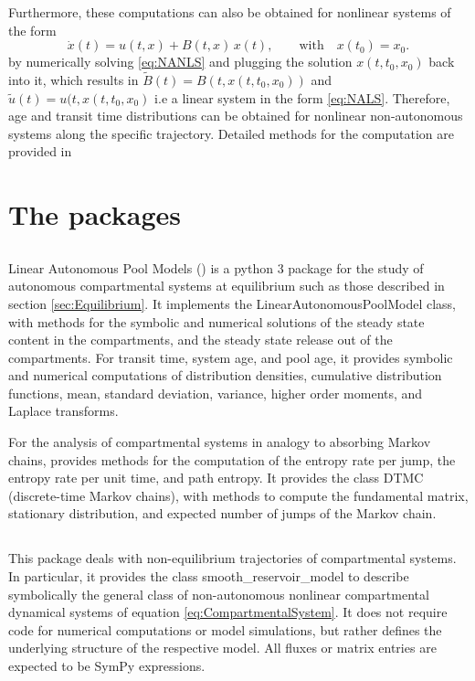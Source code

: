 Furthermore, these computations can also be obtained for nonlinear systems of the form
\begin{equation} \label{eq:NANLS}
\dot{x}(t) = u(t, x) + B(t, x) \, x(t), \qquad  \mathrm{with} \quad x(t_0) = x_0.
\end{equation}
by numerically solving \eqref{eq:NANLS} and plugging the solution $x(t, t_0,
x_0)$ back into it, which results in $\tilde{B}(t)=B(t,x(t, t_0,x_0))$ and
$\tilde{u}(t)=u(t,x(t, t_0,x_0)$  i.e a linear system in the form
\eqref{eq:NALS}. 
Therefore,  age and transit time
distributions can be obtained for nonlinear non-autonomous systems along the
specific trajectory. Detailed methods for the computation are provided in
\citet{Metzler2018PNAS}

\section{The \python packages}
\label{sec:PythonPackages}
\subsection{\LAPM}
Linear Autonomous Pool Models (\LAPM) is a python 3 package for the study of autonomous compartmental systems at equilibrium such as those described in section \ref{sec:Equilibrium}. 
It implements the LinearAutonomousPoolModel class, with methods for the
symbolic and numerical solutions of the steady state content in the compartments, and the steady state release out of the compartments. For transit time, system age, and pool age, it provides symbolic and numerical computations of distribution densities, cumulative distribution functions, mean, standard deviation,           variance, higher order moments, and Laplace transforms. 

For the analysis of compartmental systems in analogy to absorbing Markov chains, \LAPM provides methods for the computation of the entropy rate per jump, the entropy rate per unit time, and path entropy. It provides the class DTMC (discrete-time Markov chains), with methods to compute the fundamental matrix, stationary distribution, and expected number of jumps of the Markov chain.

\subsection{\CompartmentalSystems}
This package deals with non-equilibrium trajectories of compartmental systems.
In particular, it provides the class smooth\_reservoir\_model to describe
symbolically the general class of non-autonomous nonlinear compartmental
dynamical systems of equation \eqref{eq:CompartmentalSystem}. It does not
require code for numerical computations or model simulations, but rather defines the underlying structure of the respective model. 
All fluxes or matrix entries are expected to be SymPy expressions. 

